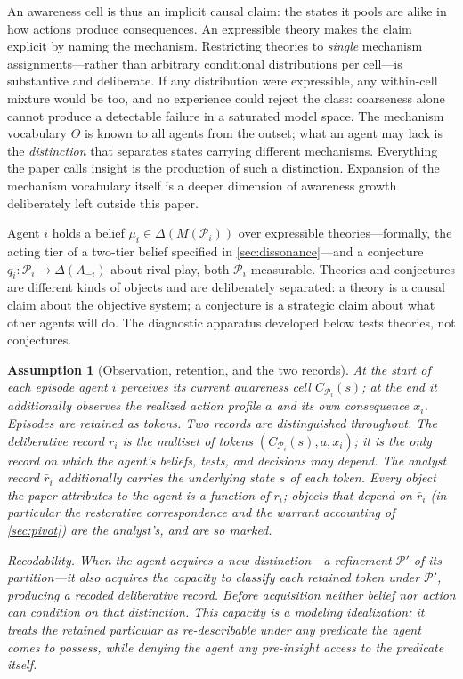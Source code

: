 \documentclass[11pt]{article}
\newtheorem{assumption}{Assumption}[section]
\theoremstyle{definition}
\begin{document}
An awareness cell is thus an implicit causal claim: the states it pools are
alike in how actions produce consequences.  An expressible theory makes the
claim explicit by naming the mechanism.  Restricting theories to
\emph{single} mechanism assignments---rather than arbitrary conditional
distributions per cell---is substantive and deliberate.  If any distribution
were expressible, any within-cell mixture would be too, and no experience
could reject the class: coarseness alone cannot produce a detectable failure
in a saturated model space.  The mechanism vocabulary $\Theta$ is known to
all agents from the outset; what an agent may lack is the \emph{distinction}
that separates states carrying different mechanisms.  Everything the paper
calls insight is the production of such a distinction.  Expansion of the
mechanism vocabulary itself is a deeper dimension of awareness growth
deliberately left outside this paper.

Agent $i$ holds a belief $\mu_i\in\Delta(M(\mathcal P_i))$ over expressible
theories---formally, the acting tier of a two-tier belief specified in
\cref{sec:dissonance}---and a conjecture
$q_i:\mathcal P_i\to\Delta(A_{-i})$ about rival play, both
$\mathcal P_i$-measurable.  Theories and conjectures are different
kinds of objects and are deliberately separated: a theory is a causal claim
about the objective system; a conjecture is a strategic claim about what
other agents will do.  The diagnostic apparatus developed below tests
theories, not conjectures.

\begin{assumption}[Observation, retention, and the two records]
\label{ass:observation}
At the start of each episode agent $i$ perceives its current awareness cell
$C_{\mathcal P_i}(s)$; at the end it additionally observes the realized action
profile $a$ and its own consequence $x_i$.  Episodes are retained as tokens.
Two records are distinguished throughout.  The \emph{deliberative record}
$r_i$ is the multiset of tokens $(C_{\mathcal P_i}(s),a,x_i)$; it is the only
record on which the agent's beliefs, tests, and decisions may depend.  The
\emph{analyst record} $\bar r_i$ additionally carries the underlying state $s$
of each token.  Every object the paper attributes to the agent is a function
of $r_i$; objects that depend on $\bar r_i$ (in particular the restorative
correspondence and the warrant accounting of \cref{sec:pivot}) are the
analyst's, and are so marked.

\emph{Recodability.}  When the agent acquires a new distinction---a refinement
$\mathcal P'$ of its partition---it also acquires the capacity to classify
each retained token under $\mathcal P'$, producing a recoded deliberative
record.  Before acquisition neither belief nor action can condition on that
distinction.  This capacity is a modeling idealization: it treats the retained
particular as re-describable under any predicate the agent comes to possess,
while denying the agent any pre-insight access to the predicate itself.
\end{assumption}
\end{document}
